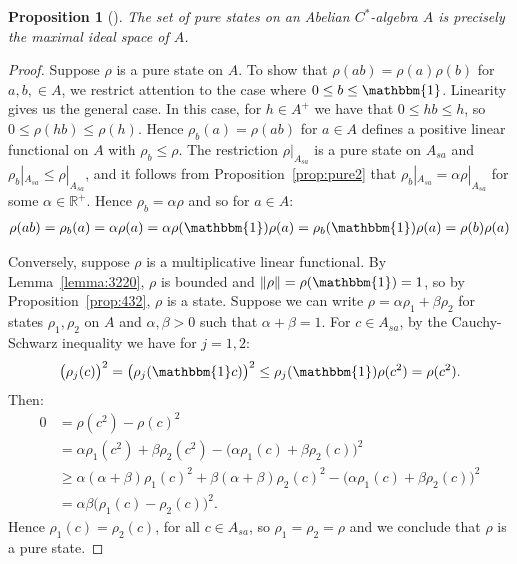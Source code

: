 \documentclass[11pt,a4paper]{report}
\theoremstyle{plain}
\newtheorem{prop}{Proposition}
\theoremstyle{definition}
\newcommand{\1}{\mathbbm{1}}
\newcommand{\R}{\mathbb{R}}
\begin{document}
\begin{prop}[{\cite[4.4.1]{kadison83}}]\label{prop:puremult}
	The set of pure states on an Abelian $C^\ast$-algebra $A$ is precisely the 
	maximal ideal space of $A$.
\end{prop}
\begin{proof}
	Suppose $\rho$ is a pure state on $A$. To show that $\rho(ab)=\rho(a)\rho(b)$ 
	for $a,b,\in A$, we restrict attention to the case where $0\leq b\leq\1$. 
	Linearity gives us the general case. In this case, for $h\in A^+$ we have that 
	$0\leq hb\leq h$, so $0\leq\rho(hb)\leq\rho(h)$. Hence $\rho_b(a)=\rho(ab)$ for 
	$a\in A$ defines a positive linear functional on $A$ with $\rho_b\leq\rho$. The 
	restriction $\rho|_{A_{sa}}$ is a pure state on $A_{sa}$ and $\rho_b|_{A_{sa}} 
	\leq \rho|_{A_{sa}}$, and it follows from Proposition~\ref{prop:pure2} that 
	$\rho_b|_{A_{sa}} = \alpha \rho|_{A_{sa}}$ for some $\alpha \in \R^+$.
	Hence $\rho_b = \alpha\rho$  and so for $a\in A$:
	\begin{align*}
		\rho(ab) = \rho_b(a) = \alpha\rho(a) = 
							\alpha\rho(\1)\rho(a) = \rho_b(\1)\rho(a) = \rho(b)\rho(a)
	\end{align*}
	
	Conversely, suppose $\rho$ is a multiplicative linear functional. By 
	Lemma~\ref{lemma:3220}, $\rho$ is bounded and $\left\|\rho\right\|=\rho(\1)=1$, 
	so by Proposition~\ref{prop:432}, $\rho$ is a state. Suppose we can write 
	$\rho=\alpha\rho_1+\beta\rho_2$ for states $\rho_1,\rho_2$ on $A$ and 
	$\alpha,\beta >0$ such that $\alpha+\beta=1$. For $c\in A_{sa}$, by the 
	Cauchy-Schwarz inequality we have for $j=1,2$:
	\begin{align*}
		\big(\rho_j(c)\big)^2 = \big(\rho_j(\1 c)\big)^2 
					\leq \rho_j(\1)\rho(c^2)=\rho(c^2).
	\end{align*}
	Then:
	\begin{align*}
				0
		&=		\rho(c^2)-\rho(c)^2 														\\
		&=		\alpha\rho_1(c^2)+\beta\rho_2(c^2) 
						- \big(\alpha\rho_1(c)+\beta\rho_2(c)\big)^2						\\
		&\geq	\alpha(\alpha+\beta)\rho_1(c)^2 
						+ \beta(\alpha+\beta)\rho_2(c)^2
						- \big(\alpha\rho_1(c)+\beta\rho_2(c)\big)^2						\\
		&=		\alpha\beta\big(\rho_1(c) - \rho_2(c)\big)^2.
	\end{align*}
	Hence $\rho_1(c)=\rho_2(c)$, for all $c\in A_{sa}$, so $\rho_1=\rho_2 =\rho$ and 
	we conclude that $\rho$ is a pure state.
\end{proof}
\end{document}
